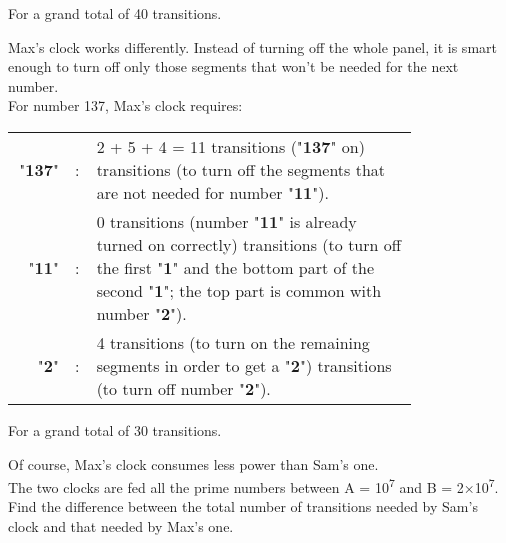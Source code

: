 For a grand total of 40 transitions.

Max's clock works differently. Instead of turning off the whole panel,
it is smart enough to turn off only those segments that won't be needed
for the next number.\\
For number 137, Max's clock requires:\\

\begin{longtable}[]{@{}rlp{0.8\linewidth}@{}}
\toprule
\endhead
"\textbf{137}" & : & 2 + 5 + 4 = 11 transitions ("\textbf{137}" on)\newline
7 transitions (to turn off the segments that are not needed for number "\textbf{11}").\\
"\textbf{11}" & : & 0 transitions (number "\textbf{11}" is already turned on correctly)\newline
3 transitions (to turn off the first "\textbf{1}" and the bottom part of the second "\textbf{1}";\newline
the top part is common with number "\textbf{2}").\\
"\textbf{2}" & : & 4 transitions (to turn on the remaining segments in order to get a "\textbf{2}")\newline
5 transitions (to turn off number "\textbf{2}").\\
\bottomrule
\end{longtable}

For a grand total of 30 transitions.

Of course, Max's clock consumes less power than Sam's one.\\
The two clocks are fed all the prime numbers between A =
10\textsuperscript{7} and B = 2×10\textsuperscript{7}.\\
Find the difference between the total number of transitions needed by
Sam's clock and that needed by Max's one.